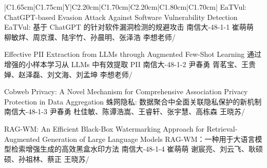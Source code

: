 \Needspace{7.5cm}
\begin{tabularx}{\textwidth}{|C{1.65cm}|C{1.75cm}|Y|C{2.20cm}|C{1.70cm}|C{2.20cm}|C{1.80cm}|C{1.70cm}|}
\HeaderRow
{}
{EaTVul: ChatGPT-based Evasion Attack Against Software Vulnerability Detection \newline 
EaTVul:  基于 ChatGPT 的针对软件漏洞检测的规避攻击}
{南信大-48-1-1}
{崔萌萌}
{柳敏烊、周京濮、陆宇竹、孙晨明、张泽浩}
{李想老师}{/}

{Effective PII Extraction from LLMs through Augmented Few-Shot Learning \newline  通过增强的小样本学习从 LLMs 中有效提取 PII}
{南信大-48-1-2}
{尹春勇}
{胥茗宝、王贵婵、赵泽磊、刘文海、刘孟坤}
{李想老师}{/}




{Cobweb Privacy: A Novel Mechanism for Comprehensive Association Privacy Protection in Data Aggregation \newline 蛛网隐私: 数据聚合中全面关联隐私保护的新机制}
{南信大-48-1-3}
{尹春勇}
{杜佳敏、陈谭浩嵩、王睿轩、张宇慧、高栋森}
{王晓苏}{/}

{RAG-WM: An Efficient Black-Box Watermarking Approach for Retrieval-Augmented Generation of Large Language Models \newline RAG-WM：一种用于大语言模型检索增强生成的高效黑盒水印方法}
{南信大-48-1-4}
{崔萌萌}
{谢宸亮、刘云飞、耿硕硕、孙祖林、蔡正}
{王晓苏}{/}
\end{tabularx}
\BlockGap


